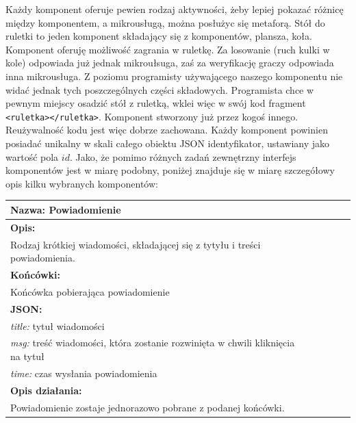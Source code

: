 \documentclass[licencjacka]{pracamgr}
\begin{document}
Każdy komponent oferuje pewien rodzaj aktywności, żeby lepiej pokazać różnicę między komponentem, a mikrousługą,
można posłużyc się metaforą. Stół do ruletki to jeden komponent składający się z komponentów, plansza, koła.
Komponent oferuję możliwość zagrania w ruletkę. Za losowanie (ruch kulki w kole) odpowiada już jednak mikroułsuga, zaś za weryfikację
graczy odpowiada inna mikrousługa. Z poziomu programisty używającego naszego komponentu nie widać jednak
tych poszczególnych części składowych. Programista chce w pewnym miejscy osadzić stół z ruletką, wklei więc w swój kod fragment \texttt{<ruletka></ruletka>}. Komponent stworzony już przez kogoś innego. Reużywalność kodu jest więc dobrze zachowana.
Każdy komponent powinien posiadać unikalny w skali całego obiektu JSON identyfikator, ustawiany jako wartość pola $id$.
Jako, że pomimo różnych zadań zewnętrzny interfejs komponentów jest w miarę podobny, 
poniżej znajduje się w miarę szczegółowy opis kilku wybranych komponentów: \\

\vspace{55pt}

\begin{tabularx}{\linewidth}{|l|l|c|X|l|}\hline
\textbf{Nazwa:}
Powiadomienie
\\\hline
\textbf{Opis:}\\

Rodzaj krótkiej wiadomości, składającej się z tytyłu i treści powiadomienia.\\\hline
\textbf{Końcówki:}\\
Końcówka pobierająca powiadomienie\\\hline
\textbf{JSON:}\\
\textit{title:} tytuł wiadomości\\
\textit{msg:} treść wiadomości, która zostanie rozwinięta w chwili kliknięcia na tytuł\\
\textit{time:} czas wysłania powiadomienia\\\hline
\textbf{Opis działania:}\\
Powiadomienie zostaje jednorazowo pobrane z podanej końcówki.\\\hline
\end{tabularx}
\end{document}
